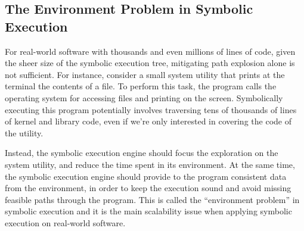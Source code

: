 \subsection{The Environment Problem in Symbolic Execution}


For real-world software with thousands and even millions of lines of code, given the sheer size of the symbolic execution tree, mitigating path explosion alone is not sufficient.
%
For instance, consider a small system utility that prints at the terminal the contents of a file.  To perform this task, the program calls the operating system for accessing files and printing on the screen.
%
Symbolically executing this program potentially involves traversing tens of thousands of lines of kernel and library code, even if we're only interested in covering the code of the utility.



Instead, the symbolic execution engine should focus the exploration on the system utility, and reduce the time spent in its environment.
%
At the same time, the symbolic execution engine should provide to the program consistent data from the environment, in order to keep the execution sound and avoid missing feasible paths through the program.
%
This is called the ``environment problem'' in symbolic execution and it is the main scalability issue when applying symbolic execution on real-world software.


